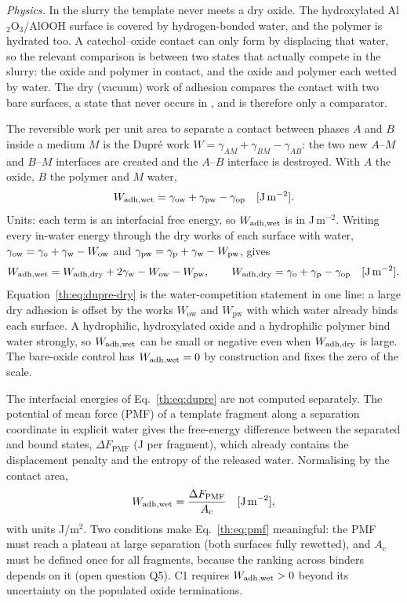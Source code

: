 \textit{Physics.} In the slurry the template never meets a dry oxide. The hydroxylated
Al$_2$O$_3$/AlOOH surface is covered by hydrogen-bonded water, and the polymer is hydrated too.
A catechol--oxide contact can only form by displacing that water, so the relevant comparison is
between two states that actually compete in the slurry: the oxide and polymer in contact, and
the oxide and polymer each wetted by water. The dry (vacuum) work of adhesion compares the
contact with two bare surfaces, a state that never occurs in \Rs, and is therefore only a
comparator.

The reversible work per unit area to separate a contact between phases $A$ and $B$ inside a
medium $M$ is the Dupr\'e work $W=\gamma_{AM}+\gamma_{BM}-\gamma_{AB}$: the two new $A$--$M$ and
$B$--$M$ interfaces are created and the $A$--$B$ interface is destroyed. With $A$ the oxide,
$B$ the polymer and $M$ water,
\begin{equation}\label{th:eq:dupre}
W_\mathrm{adh,wet}=\gamma_\mathrm{ow}+\gamma_\mathrm{pw}-\gamma_\mathrm{op} \quad[\mathrm{J\,m^{-2}}].
\end{equation}
Units: each term is an interfacial free energy, so $W_\mathrm{adh,wet}$ is in J\,m$^{-2}$. Writing every
in-water energy through the dry works of each surface with water,
$\gamma_\mathrm{ow}=\gamma_\mathrm{o}+\gamma_\mathrm{w}-W_\mathrm{ow}$ and $\gamma_\mathrm{pw}=\gamma_\mathrm{p}+\gamma_\mathrm{w}-W_\mathrm{pw}$, gives
\begin{equation}\label{th:eq:dupre-dry}
W_\mathrm{adh,wet}=W_\mathrm{adh,dry}+2\gamma_\mathrm{w}-W_\mathrm{ow}-W_\mathrm{pw},\qquad W_\mathrm{adh,dry}=\gamma_\mathrm{o}+\gamma_\mathrm{p}-\gamma_\mathrm{op} \quad[\mathrm{J\,m^{-2}}].
\end{equation}
Equation~\eqref{th:eq:dupre-dry} is the water-competition statement in one line: a large dry
adhesion is offset by the works $W_\mathrm{ow}$ and $W_\mathrm{pw}$ with which water already
binds each surface. A hydrophilic, hydroxylated oxide and a hydrophilic polymer bind water
strongly, so $W_\mathrm{adh,wet}$ can be small or negative even when $W_\mathrm{adh,dry}$ is large. The bare-oxide control
has $W_\mathrm{adh,wet}=0$ by construction and fixes the zero of the scale.

The interfacial energies of Eq.~\eqref{th:eq:dupre} are not computed separately. The potential
of mean force (PMF) of a template fragment along a separation coordinate in explicit water gives
the free-energy difference between the separated and bound states, $\Delta F_\mathrm{PMF}$
(J per fragment), which already contains the displacement penalty and the entropy of the
released water. Normalising by the contact area,
\begin{equation}\label{th:eq:pmf}
W_\mathrm{adh,wet}=\frac{\Delta F_\mathrm{PMF}}{A_\mathrm{c}} \quad[\mathrm{J\,m^{-2}}],
\end{equation}
with units J/m$^2$. Two conditions make Eq.~\eqref{th:eq:pmf} meaningful: the PMF must reach a
plateau at large separation (both surfaces fully rewetted), and $A_\mathrm{c}$ must be defined
once for all fragments, because the ranking across binders depends on it (open question Q5).
C1 requires $W_\mathrm{adh,wet}>0$ beyond its uncertainty on the populated oxide terminations.

